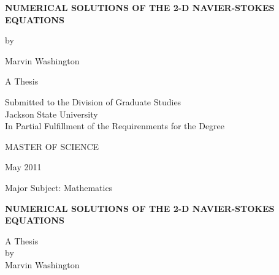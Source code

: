 
%
\thispagestyle{empty}
\begin{center}

{\Large \bf NUMERICAL SOLUTIONS OF THE 2-D NAVIER-STOKES EQUATIONS}

\end{center}


\begin{center}
by
\end{center}

\begin{center}
 {\Large Marvin Washington} 
\end{center}


\begin{center}
A Thesis
\end{center}

\begin{center}
Submitted to the Division of Graduate Studies\\
Jackson State University\\
 In Partial Fulfillment of the Requirenments for the Degree
\end{center}

\begin{center}
MASTER OF SCIENCE
\end{center}

\begin{center}
May 2011
\end{center}


\begin{center}
Major Subject: Mathematics
\end{center}
\newpage
\thispagestyle{empty}
 
 \begin{center}

{\Large \bf NUMERICAL SOLUTIONS OF THE 2-D NAVIER-STOKES EQUATIONS}

\end{center}

\begin{center}
A Thesis\\ by\\  {\Large Marvin Washington} 
\end{center}

